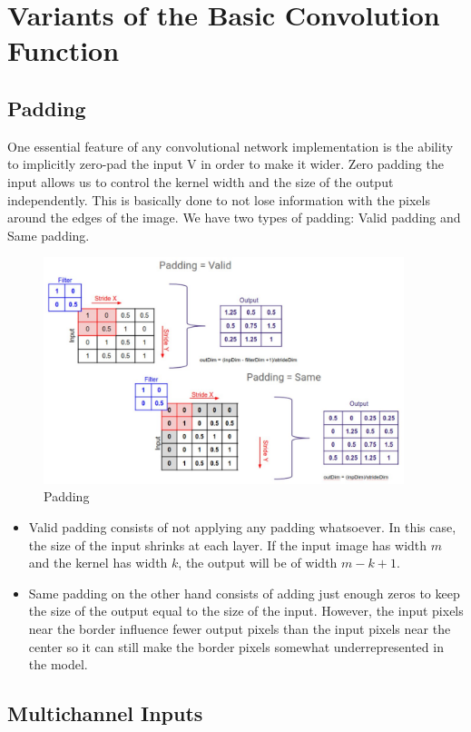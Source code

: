 \newpage
\section{Variants of the Basic Convolution Function}
\subsection{Padding}

One essential feature of any convolutional network implementation is the ability to implicitly zero-pad the input V in order to make it wider. Zero padding the input allows us to control the kernel width and the size of the output independently. This is basically done to not lose information with the pixels around the edges of the image. We have two types of padding: Valid padding and Same padding.

\begin{figure}[h]
    \centering
    \includegraphics[width=10.5cm]{Images/padding.jpg}
    \caption{Padding}
\end{figure}

\begin{itemize}
    \item Valid padding consists of not applying any padding whatsoever. In this case, the size of the input shrinks at each layer. If the input image has width $m$ and the kernel has width $k$, the output will be of width $m - k + 1$.
    \item Same padding on the other hand consists of adding just enough zeros to keep the size of the output equal to the size of the input. However, the input pixels near the border influence fewer output pixels than the input pixels near the center so it can still make the border pixels somewhat underrepresented in the model.
\end{itemize}

\newpage
\subsection{Multichannel Inputs}

